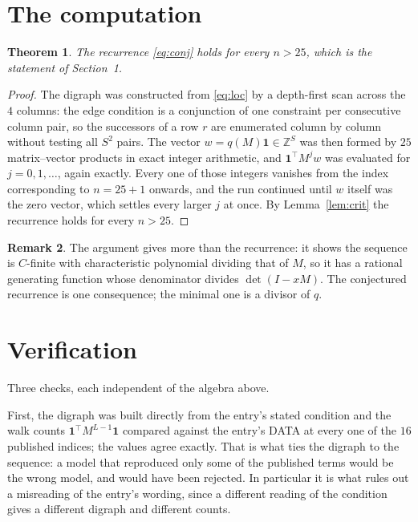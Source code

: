 \documentclass[11pt,a4paper]{article}
\theoremstyle{plain}
\newtheorem{theorem}{Theorem}
\theoremstyle{definition}
\newtheorem{remark}[theorem]{Remark}
\begin{document}
\section{The computation}

\begin{theorem}
The recurrence \eqref{eq:conj} holds for every $n>25$, which is the statement of
Section~1.
\end{theorem}

\begin{proof}
The digraph was constructed from \eqref{eq:loc} by a depth-first scan across the $4$
columns: the edge condition is a conjunction of one constraint per consecutive column
pair, so the successors of a row $r$ are enumerated column by column without testing all
$S^2$ pairs. The vector $w=q(M)\mathbf{1}\in\mathbb{Z}^{S}$ was then formed by $25$
matrix--vector products in exact integer arithmetic, and $\mathbf{1}^{\!\top}M^{j}w$ was
evaluated for $j=0,1,\dots$, again exactly. Every one of those integers vanishes from the
index corresponding to $n=25+1$ onwards, and the run continued until $w$ itself was the
zero vector, which settles every larger $j$ at once. By Lemma~\ref{lem:crit} the recurrence
holds for every $n>25$.
\end{proof}

\begin{remark}
The argument gives more than the recurrence: it shows the sequence is $C$-finite with
characteristic polynomial dividing that of $M$, so it has a rational generating function
whose denominator divides $\det(I-xM)$. The conjectured recurrence is one consequence; the
minimal one is a divisor of $q$.
\end{remark}

\section{Verification}

Three checks, each independent of the algebra above.

First, the digraph was built directly from the entry's stated condition and the walk counts
$\mathbf{1}^{\!\top}M^{L-1}\mathbf{1}$ compared against the entry's DATA at
every one of the $16$ published indices; the values agree exactly. That is what ties
the digraph to the sequence: a model that reproduced only some of the published terms would
be the wrong model, and would have been rejected. In particular it is what rules out a
misreading of the entry's wording, since a different reading of the condition gives a
different digraph and different counts.
\end{document}
